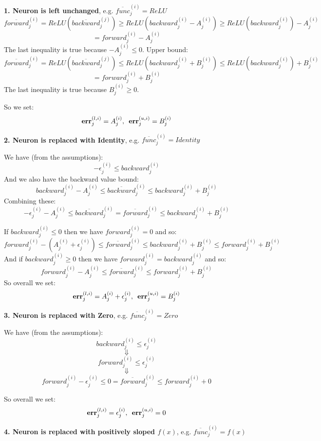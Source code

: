 \documentclass[10pt, conference, twocolumn, compsocconf]{IEEEtran}
\theoremstyle{remark}
\begin{document}
\begin{appendices}
\noindent
{\bf 1. Neuron is left unchanged}, e.g. $\overline{func}_j^{(i)} = ReLU$
\[
    \overline{forward}_j^{(i)} = ReLU(\overline{backward}_j^{(j)}) \geq ReLU({backward}_j^{(i)} - A_j^{(i)}) \geq ReLU({backward}_j^{(i)}) - A_j^{(i)}
\]
\[
    = {forward}_j^{(i)} - A_j^{(i)}
\]
\noindent
The last inequality is true because $-A_j^{(i)} \leq 0$. Upper bound:
\[
    \overline{forward}_j^{(i)} = ReLU(\overline{backward}_j^{(j)}) \leq ReLU({backward}_j^{(i)} + B_j^{(i)}) \leq ReLU({backward}_j^{(i)}) + B_j^{(i)}
\]
\[
    = {forward}_j^{(i)} + B_j^{(i)}
\]
\noindent
The last inequality is true because $B_j^{(i)} \geq 0$.

\noindent
So we set:
\[{\bf err}_j^{(l,i)} = A_j^{(i)} \mbox{,\ \ } {\bf err}_j^{(u,i)} = B_j^{(i)} \]

\noindent
{\bf 2. Neuron is replaced with Identity}, e.g. $\overline{func}_j^{(i)} = Identity$

\noindent
We have (from the assumptions):
\[ -\epsilon_j^{(i)} \leq backward_j^{(i)} \]
And we also have the backward value bound:
\[ backward^{(i)}_{j} - A^{(i)}_{j} \leq \overline{backward}_j^{(i)} \leq backward^{(i)}_{j} + B^{(i)}_{j} \]
Combining these:
\[ -\epsilon_j^{(i)} - A^{(i)}_{j} \leq \overline{backward}_j^{(i)} = \overline{forward}_j^{(i)} \leq backward^{(i)}_{j} + B^{(i)}_{j} \]

\noindent
If $backward_j^{(i)} \leq 0$ then we have $forward_j^{(i)} = 0$ and so:
\[ forward_j^{(i)} - (A^{(i)}_{j} + \epsilon_j^{(i)}) \leq \overline{forward}_j^{(i)} \leq backward^{(i)}_{j} + B^{(i)}_{j} \leq forward_j^{(i)} + B^{(i)}_{j} \]
And if $backward_j^{(i)} \geq 0$ then we have $forward_j^{(i)} = backward_j^{(i)}$ and so:
\[ forward^{(i)}_{j} - A^{(i)}_{j} \leq \overline{forward}_j^{(i)} \leq forward^{(i)}_{j} + B^{(i)}_{j} \]
So overall we set:
\[{\bf err}_j^{(l,i)} = A^{(i)}_{j} + \epsilon_j^{(i)} \mbox{,\ \ } {\bf err}_j^{(u,i)} = B_j^{(i)} \]

\noindent
{\bf 3. Neuron is replaced with Zero}, e.g. $\overline{func}_j^{(i)} = Zero$

\noindent
We have (from the assumptions):
\[ backward_j^{(i)} \leq \epsilon_j^{(i)} \]
\[ \Downarrow \]
\[ forward_j^{(i)} \leq \epsilon_j^{(i)} \]
\[ \Downarrow \]
\[ forward_j^{(i)} - \epsilon_j^{(i)} \leq 0 = \overline{forward}_j^{(i)} \leq forward_j^{(i)} + 0 \]

\noindent
So overall we set:
\[{\bf err}_j^{(l,i)} = \epsilon_j^{(i)} \mbox{,\ \ } {\bf err}_j^{(u,i)} = 0 \]

\noindent
{\bf 4. Neuron is replaced with positively sloped $f(x)$}, e.g. $\overline{func}_j^{(i)} = f(x)$


\end{appendices}
\end{document}
